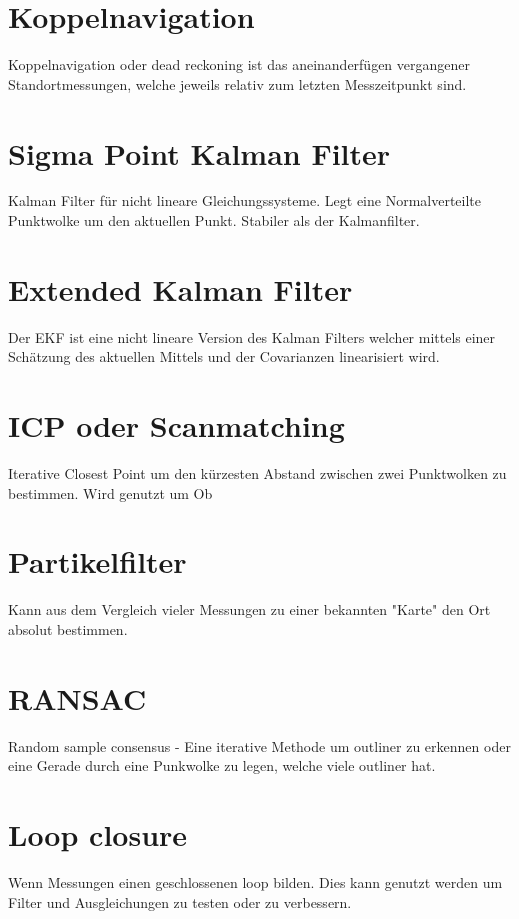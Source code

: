 \section{Koppelnavigation}
\label{uebersicht:sec:Koppelnavigation}
	Koppelnavigation oder dead reckoning ist das aneinanderfügen vergangener Standortmessungen, welche jeweils relativ zum letzten Messzeitpunkt sind.
	
\section{Sigma Point Kalman Filter}
\label{uebersicht:sec:SigmaPointKalmanFilter}
	Kalman Filter für nicht lineare Gleichungssysteme. Legt eine Normalverteilte Punktwolke um den aktuellen Punkt. Stabiler als der Kalmanfilter.

\section{Extended Kalman Filter}
\label{uebersicht:sec:ExtendedKalmanFilter}
	Der EKF ist eine nicht lineare Version des Kalman Filters welcher mittels einer Schätzung des 
	aktuellen Mittels und der Covarianzen linearisiert wird.

\section{ICP oder Scanmatching}
\label{uebersicht:sec:ICPoderScanmatching}
	Iterative Closest Point um den kürzesten Abstand zwischen zwei Punktwolken zu bestimmen. Wird genutzt um Ob

\section{Partikelfilter}
\label{uebersicht:sec:Partikelfilter}
	Kann aus dem Vergleich vieler Messungen zu einer bekannten "Karte" den Ort absolut bestimmen.

\section{RANSAC}
\label{uebersicht:sec:RANSAC}
	Random sample consensus - Eine iterative Methode um outliner zu erkennen oder eine Gerade durch eine Punkwolke zu legen, welche viele outliner hat.

\section{Loop closure}
\label{uebersicht:sec:LoopClosure}
	Wenn Messungen einen geschlossenen loop bilden. Dies kann genutzt werden um Filter und Ausgleichungen zu testen oder zu verbessern.

